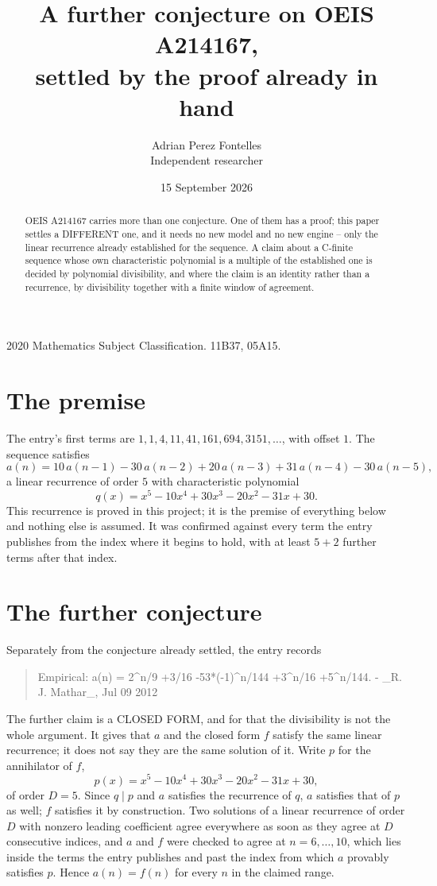 \documentclass[11pt,a4paper]{article}
\title{A further conjecture on OEIS A214167,\\ \large settled by the proof already in hand}
\author{Adrian Perez Fontelles\\ \small Independent researcher}
\date{15 September 2026}
\theoremstyle{plain}
\theoremstyle{definition}
\begin{document}
\maketitle

\begin{abstract}
OEIS A214167 carries more than one conjecture. One of them has a proof; this paper settles a
DIFFERENT one, and it needs no new model and no new engine -- only the linear recurrence already
established for the sequence. A claim about a C-finite sequence whose own characteristic
polynomial is a multiple of the established one is decided by polynomial divisibility, and where
the claim is an identity rather than a recurrence, by divisibility together with a finite window
of agreement.
\end{abstract}

\noindent\small 2020 Mathematics Subject Classification. 11B37, 05A15.\normalsize

\section{The premise}

The entry's first terms are $1, 1, 4, 11, 41, 161, 694, 3151,\dots$, with offset $1$. The sequence satisfies
\[
  a(n)=10\,a(n-1) - 30\,a(n-2) + 20\,a(n-3) + 31\,a(n-4) - 30\,a(n-5) ,
\]
a linear recurrence of order $5$ with characteristic polynomial
\[
  q(x)=x^{5} - 10 x^{4} + 30 x^{3} - 20 x^{2} - 31 x + 30 .
\]
This recurrence is proved in this project; it is the premise of everything below and nothing else is assumed.
It was confirmed against every term the entry publishes from the index where it begins to hold,
with at least $5+2$ further terms after that index.

\section{The further conjecture}

Separately from the conjecture already settled, the entry records

\begin{quote}\raggedright Empirical: a(n) = 2\^{}n/9 +3/16 -53*(-1)\^{}n/144 +3\^{}n/16 +5\^{}n/144. - \_R. J. Mathar\_, Jul 09 2012\end{quote}

The further claim is a CLOSED FORM, and for that the divisibility is not the whole argument. It
gives that $a$ and the closed form $f$ satisfy the same linear recurrence; it does not say they
are the same solution of it. Write $p$ for the annihilator of $f$,
\[
  p(x)=x^{5} - 10 x^{4} + 30 x^{3} - 20 x^{2} - 31 x + 30 ,
\]
of order $D=5$. Since $q\mid p$ and $a$ satisfies the recurrence of $q$, $a$ satisfies that of
$p$ as well; $f$ satisfies it by construction. Two solutions of a linear recurrence of order $D$
with nonzero leading coefficient agree everywhere as soon as they agree at $D$ consecutive
indices, and $a$ and $f$ were checked to agree at $n=6,\dots,10$,
which lies inside the terms the entry publishes and past the index from which $a$ provably
satisfies $p$. Hence $a(n)=f(n)$ for every $n$ in the claimed range.
\end{document}
